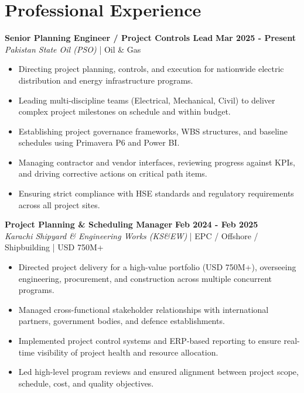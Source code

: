 \documentclass[11pt,a4paper]{article}
\begin{document}
\section{Professional Experience}
\noindent \textbf{\large Senior Planning Engineer / Project Controls Lead} \hfill \textbf{\color{awesome-blue}Mar 2025 - Present}\\
\textit{Pakistan State Oil (PSO)} | Oil \& Gas\\
\begin{itemize}
    \item Directing project planning, controls, and execution for nationwide electric distribution and energy infrastructure programs.
    \item Leading multi-discipline teams (Electrical, Mechanical, Civil) to deliver complex project milestones on schedule and within budget.
    \item Establishing project governance frameworks, WBS structures, and baseline schedules using Primavera P6 and Power BI.
    \item Managing contractor and vendor interfaces, reviewing progress against KPIs, and driving corrective actions on critical path items.
    \item Ensuring strict compliance with HSE standards and regulatory requirements across all project sites.
\end{itemize}

\noindent \textbf{\large Project Planning \& Scheduling Manager} \hfill \textbf{\color{awesome-blue}Feb 2024 - Feb 2025}\\
\textit{Karachi Shipyard \& Engineering Works (KS\&EW)} | EPC / Offshore / Shipbuilding | USD 750M+\\
\begin{itemize}
    \item Directed project delivery for a high-value portfolio (USD 750M+), overseeing engineering, procurement, and construction across multiple concurrent programs.
    \item Managed cross-functional stakeholder relationships with international partners, government bodies, and defence establishments.
    \item Implemented project control systems and ERP-based reporting to ensure real-time visibility of project health and resource allocation.
    \item Led high-level program reviews and ensured alignment between project scope, schedule, cost, and quality objectives.
\end{itemize}
\end{document}
